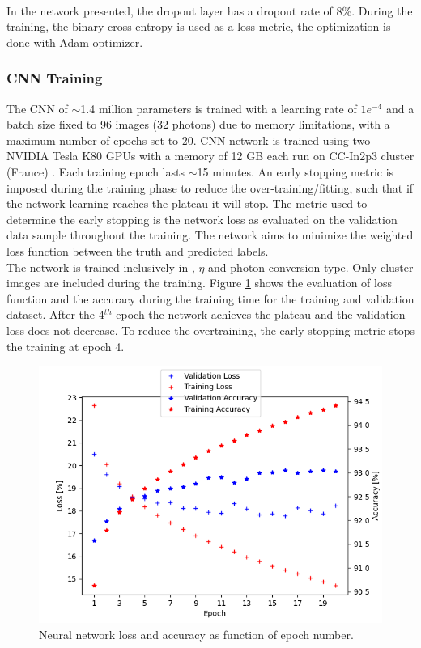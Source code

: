 \\
In the network presented, the dropout layer has a dropout rate of 8\%.
During the training, the binary cross-entropy is used as a loss metric, the optimization is done with Adam optimizer.

\subsubsection{CNN Training}
\label{gamma:CNN:Training}
The CNN of $\sim$1.4 million parameters is trained with a learning rate of $1e^{-4}$ and a batch size fixed to 96 images (32 photons) due to memory limitations, with a maximum number of epochs set to 20. CNN network is trained using two NVIDIA Tesla K80 GPUs with a memory of 12 GB each run on CC-In2p3 cluster (France) \cite{cca}. Each training epoch lasts $\sim$15 minutes. An early stopping metric \cite{early} is imposed during the training phase to reduce the over-training/fitting, such that if the network learning reaches the plateau it will stop. The metric used to determine the early stopping is the network loss as evaluated on the validation data sample throughout the training. The network aims to minimize the weighted loss function between the truth and predicted labels.\\
The network is trained inclusively in \eT, $\eta$ and photon conversion type. Only cluster images are included during the training.
Figure \ref{fig:gamma:CNN:Training:loss} shows the evaluation of loss function and the accuracy during the training time for the training and validation dataset. After the 4$^{th}$ epoch the network achieves the plateau and the validation loss does not decrease. To reduce the overtraining, the early stopping metric stops the training at epoch 4.
\begin{figure}[htbp]
    \centering
    \includegraphics[width=.6\textwidth]{Ch3/Img/CNN_Loss_Accuracy.png}
    \begin{tcolorbox}[colback=black!5!white,colframe=white!75!black]
    \caption{Neural network loss and accuracy as function of epoch number.}
    \label{fig:gamma:CNN:Training:loss}
    \end{tcolorbox}
    
\end{figure}

